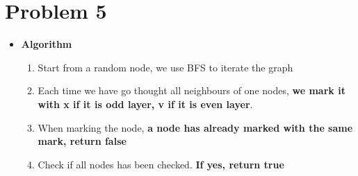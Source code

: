 \documentclass{article}
\def\math#1{$#1$}
\begin{document}
\begin{itemize}
\end{itemize}

\section{Problem 5}
\begin{itemize}
    \item [] \textbf{Algorithm}
        \begin{enumerate}[Step 1]
            \item Start from a random node, we use BFS to iterate the graph
            \item Each time we have go thought all neighbours of one nodes, \textbf{we mark it with x if it is odd layer, v if it is even layer}.
            \item When marking the node, \textbf{a node has already marked with the same mark, return false}
            \item Check if all nodes has been checked. \textbf{If yes, return true}
        \end{enumerate}
\end{itemize}
\end{document}

